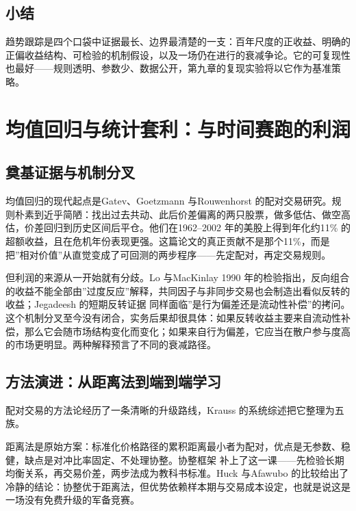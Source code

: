 \documentclass[12pt,a4paper]{ctexart}
\begin{document}
\subsection{小结}

趋势跟踪是四个口袋中证据最长、边界最清楚的一支：百年尺度的正收益\cite{04, 05}、明确的正偏收益结构\cite{13, 18}、可检验的机制假设\cite{08, 11}，以及一场仍在进行的衰减争论\cite{10, 11, 16}。它的可复现性也最好——规则透明、参数少、数据公开，第九章的复现实验将以它作为基准策略。


\section{均值回归与统计套利：与时间赛跑的利润}

\subsection{奠基证据与机制分叉}

均值回归的现代起点是Gatev、Goetzmann 与Rouwenhorst 的配对交易研究\cite{28}。规则朴素到近乎简陋：找出过去共动、此后价差偏离的两只股票，做多低估、做空高估，价差回归到历史区间后平仓。他们在1962–2002 年的美股上得到年化约11\% 的超额收益，且在危机年份表现更强。这篇论文的真正贡献不是那个11\%，而是把”\hspace{0.3em}相对价值”从直觉变成了可回测的两步程序——先定配对，再定交易规则。


但利润的来源从一开始就有分歧。Lo 与MacKinlay 1990 年的检验指出，反向组合的收益不能全部由”\hspace{0.3em}过度反应”\hspace{0.3em}解释，共同因子与非同步交易也会制造出看似反转的收益\cite{29}；Jegadeesh 的短期反转证据\cite{30} 同样面临”\hspace{0.3em}是行为偏差还是流动性补偿”\hspace{0.3em}的拷问。这个机制分叉至今没有闭合，实务后果却很具体：如果反转收益主要来自流动性补偿，那么它会随市场结构变化而变化；如果来自行为偏差，它应当在散户参与度高的市场更明显。两种解释预言了不同的衰减路径。


\subsection{方法演进：从距离法到端到端学习}

配对交易的方法论经历了一条清晰的升级路线，Krauss 的系统综述把它整理为五族\cite{37}。


距离法是原始方案\cite{28}：标准化价格路径的累积距离最小者为配对，优点是无参数、稳健，缺点是对冲比率固定、不处理协整。协整框架\cite{31} 补上了这一课——先检验长期均衡关系，再交易价差，两步法成为教科书标准。Huck 与Afawubo 的比较给出了冷静的结论：协整优于距离法，但优势依赖样本期与交易成本设定\cite{32}，也就是说这是一场没有免费升级的军备竞赛。
\end{document}

